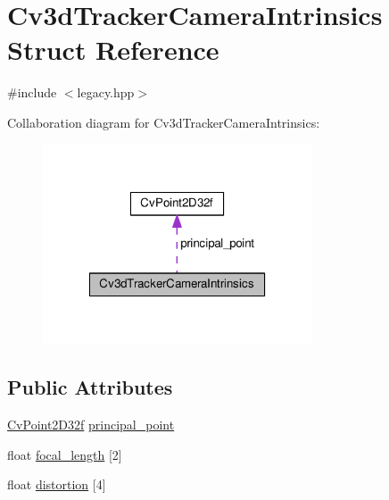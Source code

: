 \hypertarget{structCv3dTrackerCameraIntrinsics}{\section{Cv3d\-Tracker\-Camera\-Intrinsics Struct Reference}
\label{structCv3dTrackerCameraIntrinsics}
}


{\ttfamily \#include $<$legacy.\-hpp$>$}



Collaboration diagram for Cv3d\-Tracker\-Camera\-Intrinsics\-:\nopagebreak
\begin{figure}[H]
\begin{center}
\leavevmode
\includegraphics[width=226pt]{structCv3dTrackerCameraIntrinsics__coll__graph}
\end{center}
\end{figure}
\subsection*{Public Attributes}
\begin{DoxyCompactItemize}
\item 
\hyperlink{structCvPoint2D32f}{Cv\-Point2\-D32f} \hyperlink{structCv3dTrackerCameraIntrinsics_a31643cf1da19093b320317ba4339a09a}{principal\-\_\-point}
\item 
float \hyperlink{structCv3dTrackerCameraIntrinsics_a9996c0e6e05b81b97ed6182ba2a31206}{focal\-\_\-length} \mbox{[}2\mbox{]}
\item 
float \hyperlink{structCv3dTrackerCameraIntrinsics_a7df407e5654176fd372d2cc951c5270a}{distortion} \mbox{[}4\mbox{]}
\end{DoxyCompactItemize}



